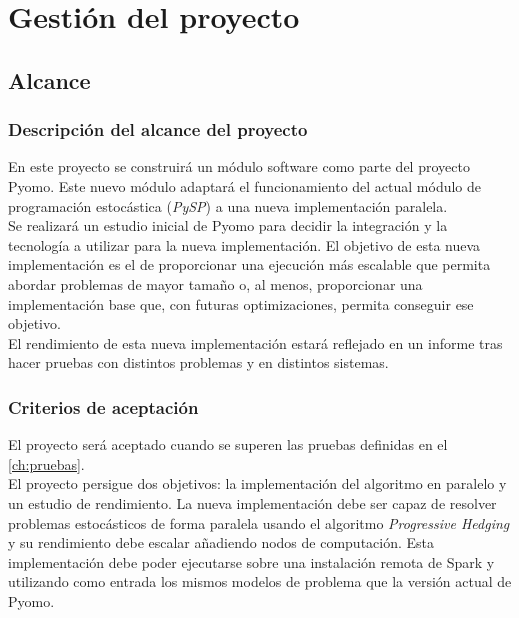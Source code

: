 \chapter{Gestión del proyecto}
\label{ch:gestion}

\section{Alcance}

\subsection{Descripción del alcance del proyecto}

En este proyecto se construirá un módulo software como parte del proyecto Pyomo. Este nuevo módulo adaptará el funcionamiento del actual módulo de programación estocástica (\textit{PySP}) a una nueva implementación paralela.\\

Se realizará un estudio inicial de Pyomo para decidir la integración y la tecnología a utilizar para la nueva implementación. El objetivo de esta nueva implementación es el de proporcionar una ejecución más escalable que permita abordar problemas de mayor tamaño o, al menos, proporcionar una implementación base que, con futuras optimizaciones, permita conseguir ese objetivo.\\

El rendimiento de esta nueva implementación estará reflejado en un informe tras hacer pruebas con distintos problemas y en distintos sistemas.

\subsection{Criterios de aceptación}

El proyecto será aceptado cuando se superen las pruebas definidas en el \autoref{ch:pruebas}.\\

El proyecto persigue dos objetivos: la implementación del algoritmo en paralelo y un estudio de rendimiento. La nueva implementación debe ser capaz de resolver problemas estocásticos de forma paralela usando el algoritmo \textit{Progressive Hedging} y su rendimiento debe escalar añadiendo nodos de computación. Esta implementación debe poder ejecutarse sobre una instalación remota de Spark y utilizando como entrada los mismos modelos de problema que la versión actual de Pyomo. 

